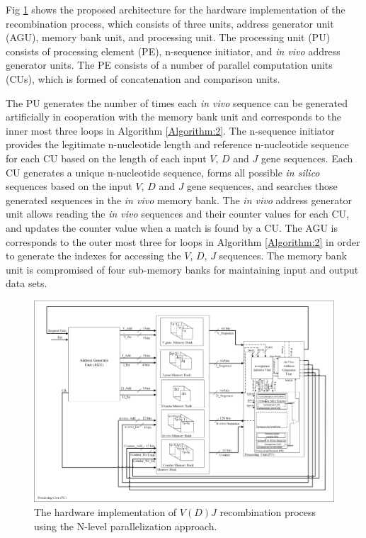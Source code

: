 Fig \ref{fig:BIG-Picture_NLevel} shows the proposed architecture for the hardware implementation of the recombination process, which consists of three units, address generator unit (AGU), memory bank unit, and  processing unit. The processing unit (PU) consists of processing element (PE), n-sequence initiator, and \emph{in vivo} address generator units. The PE consists of a number of parallel computation units (CUs), which is formed of concatenation and comparison units.   

The PU generates the number of times  each \emph{in vivo} sequence can be generated artificially in cooperation with the memory bank unit and corresponds to the inner most three loops in Algorithm \ref{Algorithm:2}. The n-sequence initiator provides the legitimate n-nucleotide length and reference n-nucleotide sequence for each CU based on the length of each input  $V$, $D$ and $J$ gene sequences. Each CU  generates a unique  n-nucleotide sequence, forms all possible  \emph{in silico} sequences based on  the input $V$, $D$ and $J$ gene sequences,  and searches those generated sequences in the \emph{in vivo} memory bank. The \emph{in vivo} address generator unit allows reading the \emph{in vivo} sequences and their counter values for each CU, and updates the counter value when a match is found by a CU. The AGU is corresponds to the outer most three for loops in Algorithm \ref{Algorithm:2} in order to generate the indexes for accessing the $V$, $D$, $J$ sequences.  The memory bank unit is compromised of four sub-memory banks for maintaining input and output data sets. 



\begin{figure}[t!]
\begin{center}
\includegraphics[clip,width=1\columnwidth]{Fig/BIG-Picture_NLevel.jpg}
\caption{The hardware implementation of $V(D)J$ recombination process using the N-level parallelization approach.}
\label{fig:BIG-Picture_NLevel}
\end{center}
\end{figure}

